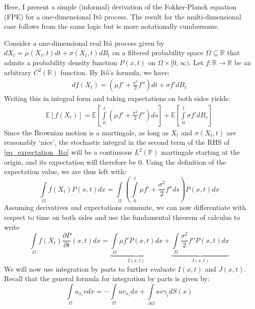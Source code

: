 Here, I present a simple (informal) derivation of the Fokker-Planck equation (FPE) for a one-dimensional It\^{o} process. The result for the multi-dimensional case follows from the same logic but is more notationally cumbersome.

Consider a one-dimensional real It\^{o} process given by $dX_t = \mu(X_t,t)dt + \sigma(X_t,t)dB_t$ on a filtered probability space $\Omega \subseteq \mathbb{R}$ that admits a probability density function $P(x,t)$ on $\Omega \times [0,\infty)$. Let $f:\mathbb{R}\to\mathbb{R}$ be an arbitrary $C^2(\mathbb{R})$ function. By It\^{o}'s formula, we have:
\begin{align*}
    df(X_t) = \left(\mu f' + \frac{\sigma^2}{2}f''\right)dt + \sigma f' dB_t
\end{align*}
Writing this in integral form and taking expectations on both sides yields:
\begin{align}
\label{eq_expectation_Ito}
    \mathbb{E}[f(X_t)] = \mathbb{E}\left[\int\limits_{0}^{t}\left(\mu f' + \frac{\sigma^2}{2}f''\right)ds\right] + \mathbb{E}\left[\int\limits_{0}^{t}\sigma f' dB_s\right]
\end{align}
Since the Brownian motion is a martingale, as long as $X_t$ and $\sigma(X_t,t)$ are reasonably `nice', the stochastic integral in the second term of the RHS of \eqref{eq_expectation_Ito} will be a continuous $L^2(\mathbb{P})$ martingale starting at the origin, and its expectation will therefore be 0. Using the definition of the expectation value, we are thus left with:
\begin{equation*}
    \int\limits_{\Omega}f(X_t)P(x,t)dx = \int\limits_{\Omega}\left(\int\limits_{0}^{t}\mu f' + \frac{\sigma^2}{2}f''ds\right)P(x,t)dx
\end{equation*}
Assuming derivatives and expectations commute, we can now differentiate with respect to time on both sides and use the fundamental theorem of calculus to write
\begin{equation}
\label{eq_Ito_to_FPE_for_parts}
\int\limits_{\Omega}f(X_t)\frac{\partial P}{\partial t}(x,t)dx = \underbrace{\int\limits_{\Omega}\mu f'P(x,t)dx}_{I(x,t)} + \underbrace{\int\limits_{\Omega}\frac{\sigma^2}{2}f''P(x,t)dx}_{J(x,t)}
\end{equation}
We will now use integration by parts to further evaluate $I(x,t)$ and $J(x,t)$. Recall that the general formula for integration by parts is given by:
\begin{equation*}
    \int\limits_{\Omega}u_{x_i}vdx = -\int\limits_{\Omega}uv_{x_i}dx + \int\limits_{\partial\Omega}uv\gamma_{i}dS(x)
\end{equation*}
